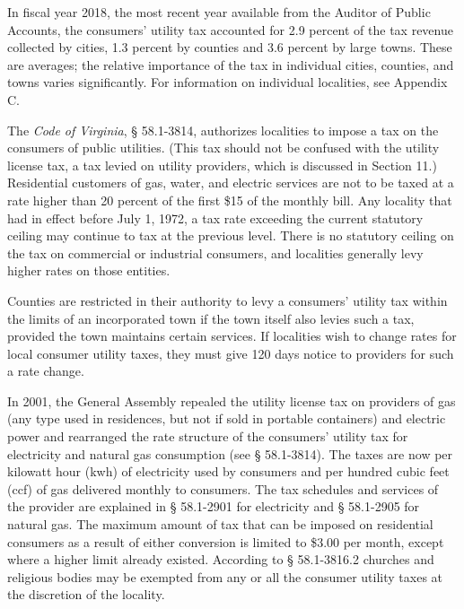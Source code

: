 \documentclass[
]{book}
\begin{document}
In fiscal year 2018, the most recent year available from the Auditor of Public Accounts, the consumers' utility tax accounted for 2.9 percent of the tax revenue collected by cities, 1.3 percent by counties and 3.6 percent by large towns. These are averages; the relative importance of the tax in individual cities, counties, and towns varies significantly. For information on individual localities, see Appendix C.

The \emph{Code of Virginia}, § 58.1-3814, authorizes localities to impose a tax on the consumers of public utilities. (This tax should not be confused with the utility license tax, a tax levied on utility providers, which is discussed in Section 11.) Residential customers of gas, water, and electric services are not to be taxed at a rate higher than 20 percent of the first \$15 of the monthly bill. Any locality that had in effect before July 1, 1972, a tax rate exceeding the current statutory ceiling may continue to tax at the previous level. There is no statutory ceiling on the tax on commercial or industrial consumers, and localities generally levy higher rates on those entities.

Counties are restricted in their authority to levy a consumers' utility tax within the limits of an incorporated town if the town itself also levies such a tax, provided the town maintains certain services. If localities wish to change rates for local consumer utility taxes, they must give 120 days notice to providers for such a rate change.

In 2001, the General Assembly repealed the utility license tax on providers of gas (any type used in residences, but not if sold in portable containers) and electric power and rearranged the rate structure of the consumers' utility tax for electricity and natural gas consumption (see § 58.1-3814). The taxes are now per kilowatt hour (kwh) of electricity used by consumers and per hundred cubic feet (ccf) of gas delivered monthly to consumers. The tax schedules and services of the provider are explained in § 58.1-2901 for electricity and § 58.1-2905 for natural gas. The maximum amount of tax that can be imposed on residential consumers as a result of either conversion is limited to \$3.00 per month, except where a higher limit already existed. According to § 58.1-3816.2 churches and religious bodies may be exempted from any or all the consumer utility taxes at the discretion of the locality.
\end{document}
